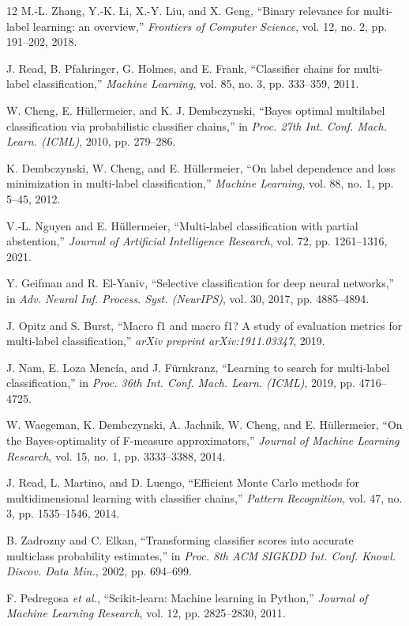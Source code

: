 \documentclass[conference]{IEEEtran}
\begin{document}
\begin{thebibliography}{12}
M.-L. Zhang, Y.-K. Li, X.-Y. Liu, and X. Geng, ``Binary relevance for multi-label learning: an overview,'' \emph{Frontiers of Computer Science}, vol. 12, no. 2, pp. 191--202, 2018.

J. Read, B. Pfahringer, G. Holmes, and E. Frank, ``Classifier chains for multi-label classification,'' \emph{Machine Learning}, vol. 85, no. 3, pp. 333--359, 2011.

W. Cheng, E. H\"ullermeier, and K. J. Dembczynski, ``Bayes optimal multilabel classification via probabilistic classifier chains,'' in \emph{Proc. 27th Int. Conf. Mach. Learn. (ICML)}, 2010, pp. 279--286.

K. Dembczynski, W. Cheng, and E. H\"ullermeier, ``On label dependence and loss minimization in multi-label classification,'' \emph{Machine Learning}, vol. 88, no. 1, pp. 5--45, 2012.

V.-L. Nguyen and E. H\"ullermeier, ``Multi-label classification with partial abstention,'' \emph{Journal of Artificial Intelligence Research}, vol. 72, pp. 1261--1316, 2021.

Y. Geifman and R. El-Yaniv, ``Selective classification for deep neural networks,'' in \emph{Adv. Neural Inf. Process. Syst. (NeurIPS)}, vol. 30, 2017, pp. 4885--4894.

J. Opitz and S. Burst, ``Macro f1 and macro f1? A study of evaluation metrics for multi-label classification,'' \emph{arXiv preprint arXiv:1911.03347}, 2019.

J. Nam, E. Loza Menc\'ia, and J. F\"urnkranz, ``Learning to search for multi-label classification,'' in \emph{Proc. 36th Int. Conf. Mach. Learn. (ICML)}, 2019, pp. 4716--4725.

W. Waegeman, K. Dembczynski, A. Jachnik, W. Cheng, and E. H\"ullermeier, ``On the Bayes-optimality of F-measure approximators,'' \emph{Journal of Machine Learning Research}, vol. 15, no. 1, pp. 3333--3388, 2014.

J. Read, L. Martino, and D. Luengo, ``Efficient Monte Carlo methods for multidimensional learning with classifier chains,'' \emph{Pattern Recognition}, vol. 47, no. 3, pp. 1535--1546, 2014.

B. Zadrozny and C. Elkan, ``Transforming classifier scores into accurate multiclass probability estimates,'' in \emph{Proc. 8th ACM SIGKDD Int. Conf. Knowl. Discov. Data Min.}, 2002, pp. 694--699.

F. Pedregosa \emph{et al.}, ``Scikit-learn: Machine learning in Python,'' \emph{Journal of Machine Learning Research}, vol. 12, pp. 2825--2830, 2011.
\end{thebibliography}
\end{document}
